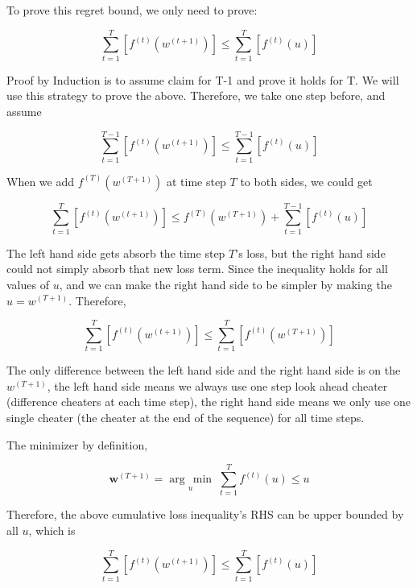\documentclass[11pt]{article}
\newcommand{\argmin}[1]{\underset{#1}{\operatorname{arg}\,\operatorname{min}}\;}
\begin{document}
To prove this regret bound, we only need to prove:

\begin{equation*}
   \sum_{t=1}^T [ f^{(t)}(w^{(t+1)})] \leq \sum_{t=1}^T [f^{(t)} (u) ]
\end{equation*}

Proof by Induction is to assume claim for T-1 and prove it holds for T. We will use this strategy to prove the above. Therefore, we take one step before, and assume

\begin{equation*}
   \sum_{t=1}^{T-1} [ f^{(t)}(w^{(t+1)})] \leq \sum_{t=1}^{T-1} [f^{(t)} (u) ]
\end{equation*}

When we add $f^{(T)}(w^{(T+1)})$ at time step $T$ to both sides, we could get

\begin{equation*}
   \sum_{t=1}^{T} [ f^{(t)}(w^{(t+1)})] \leq f^{(T)}(w^{(T+1)}) + \sum_{t=1}^{T-1} [f^{(t)} (u) ]
\end{equation*}

The left hand side gets absorb the time step $T$'s loss, but the right hand side could not simply absorb that new loss term. Since the inequality holds for all values of $u$, and we can make the right hand side to be simpler by making the $u = w^{(T+1)}$. Therefore,

\begin{equation*}
   \sum_{t=1}^{T} [ f^{(t)}(w^{(t+1)})] \leq \sum_{t=1}^{T} [f^{(t)} (w^{(T+1)}) ]
\end{equation*}

The only difference between the left hand side and the right hand side is on the $w^{(T+1)}$, the left hand side means we always use one step look ahead cheater (difference cheaters at each time step), the right hand side means we only use one single cheater (the cheater at the end of the sequence) for all time steps.

The minimizer by definition,

\begin{equation*}
    \bm{w}^{(T+1)} = \argmin u \sum_{t=1}^T f^{(t)} (u) \leq u
\end{equation*}

Therefore, the above cumulative loss inequality's RHS can be upper bounded by all $u$, which is

\begin{equation*}
   \sum_{t=1}^{T} [ f^{(t)}(w^{(t+1)})] \leq \sum_{t=1}^{T} [f^{(t)} (u) ]
\end{equation*}
\end{document}
